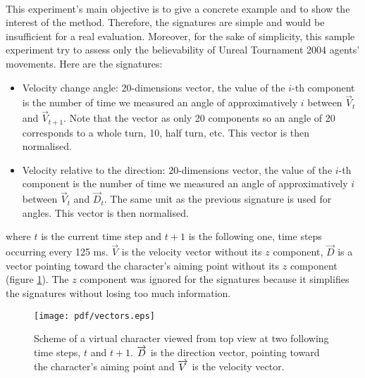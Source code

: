 \documentclass[a4paper,twocolumn]{article}
\begin{document}
\paragraph{}%
This experiment's main objective is to give a concrete example and to show the interest of the method. Therefore, the signatures are simple and would be insufficient for a real evaluation. Moreover, for the sake of simplicity, this sample experiment try to assess only the believability of Unreal Tournament 2004 agents' movements. Here are the signatures:
\begin{itemize}
 \item Velocity change angle: 20-dimensions vector, the value of the $i$-th component is the number of time we measured an angle of approximatively $i$ between $\overrightarrow{V}_t$ and $\overrightarrow{V}_{t+1}$. Note that the vector as only 20 components so an angle of 20 corresponds to a whole turn, 10, half turn, etc. This vector is then normalised.
 \item Velocity relative to the direction: 20-dimensions vector, the value of the $i$-th component is the number of time we measured an angle of approximatively $i$ between $\overrightarrow{V}_t$ and $\overrightarrow{D}_t$. The same unit as the previous signature is used for angles. This vector is then normalised.
\end{itemize}
where $t$ is the current time step and $t+1$ is the following one, time steps occurring every 125 ms. $\overrightarrow{V}$ is the velocity vector without its $z$ component, $\overrightarrow{D}$ is a vector pointing toward the character's aiming point without its $z$ component (figure \ref{vectors}). The $z$ component was ignored for the signatures because it simplifies the signatures without losing too much information.
\begin{figure}[!ht]
	\centering
	\texttt{[image: pdf/vectors.eps]}
	\caption{Scheme of a virtual character viewed from top view at two following time steps, $t$ and $t+1$. $\protect\overrightarrow{D}$ is the direction vector, pointing toward the character's aiming point and $\protect\overrightarrow{V}$ is the velocity vector.}
	\label{vectors}
\end{figure}
\end{document}
